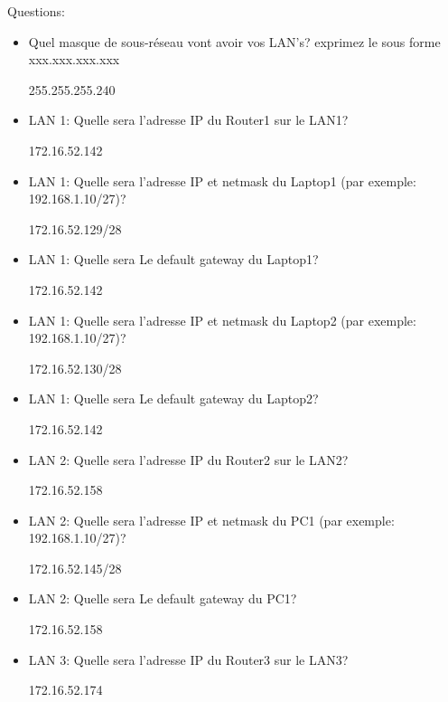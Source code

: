 \documentclass[a4paper]{article}
\begin{document}
Questions:
\begin{itemize}
    \item Quel masque de sous-réseau vont avoir vos LAN's? exprimez le sous forme xxx.xxx.xxx.xxx
    \begin{example}
        255.255.255.240
    \end{example}
    \item LAN 1: Quelle sera l'adresse IP du Router1 sur le LAN1?
    \begin{example}
        172.16.52.142
    \end{example}
    \item LAN 1: Quelle sera l'adresse IP et netmask du Laptop1 (par exemple: 192.168.1.10/27)?
    \begin{example}
        172.16.52.129/28
    \end{example}
    \item LAN 1: Quelle sera Le default gateway du Laptop1?
    \begin{example}
        172.16.52.142
    \end{example}
    \item LAN 1: Quelle sera l'adresse IP et netmask du Laptop2 (par exemple: 192.168.1.10/27)?
    \begin{example}
        172.16.52.130/28
    \end{example}
    \item LAN 1: Quelle sera Le default gateway du Laptop2?
    \begin{example}
        172.16.52.142
    \end{example}
    \item LAN 2: Quelle sera l'adresse IP du Router2 sur le LAN2?
    \begin{example}
        172.16.52.158
    \end{example}
    \item LAN 2: Quelle sera l'adresse IP et netmask du PC1 (par exemple: 192.168.1.10/27)?
    \begin{example}
        172.16.52.145/28
    \end{example}
    \item LAN 2: Quelle sera Le default gateway du PC1?
    \begin{example}
        172.16.52.158
    \end{example}
    \item LAN 3: Quelle sera l'adresse IP du Router3 sur le LAN3?
    \begin{example}
        172.16.52.174
    \end{example}

\end{itemize}
\end{document}
